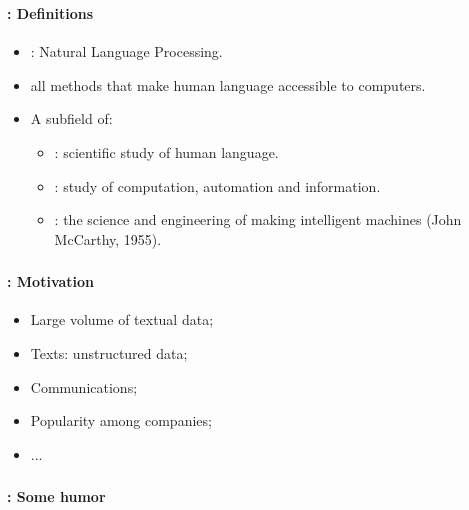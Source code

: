 \documentclass[xcolor=table]{beamer}
\subtitle[01- Introduction]{Chapter 01\\Introduction to NLP}
\begin{document}
	
\begin{frame}
	\frametitle{\inserttitle}
	\framesubtitle{\insertshortsubtitle: Definitions}
	
	\begin{itemize}
		\item {}: Natural Language Processing.
		\item all methods that make human language accessible to computers.
	\end{itemize}
	\begin{minipage}{0.78\textwidth}
		\begin{itemize}
			\item A subfield of:
			\begin{itemize}
				\item {}: scientific study of human language.
				\item {}: study of computation, automation and information.
				\item {}: the science and engineering of
				making intelligent machines (John McCarthy, 1955).
			\end{itemize}
		\end{itemize}
	\end{minipage}
	\begin{minipage}{0.20\textwidth}
	\end{minipage}

\end{frame}

\begin{frame}
	\frametitle{\inserttitle}
	\framesubtitle{\insertshortsubtitle: Motivation}
	
	\begin{itemize}
		\item Large volume of textual data;
		
		\item Texts: unstructured data;
		
		\item Communications;
		
		\item Popularity among companies;
		
		\item ...
	\end{itemize}

\end{frame}

\begin{frame}
	\frametitle{\inserttitle}
	\framesubtitle{\insertshortsubtitle: Some humor}
	
	\begin{center}
	\end{center}

\end{frame}
\end{document}
